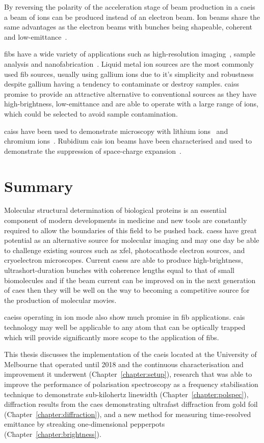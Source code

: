 By reversing the polarity of the acceleration stage of beam production in a \gls{caeis} a beam of ions can be produced instead of an electron beam.
Ion beams share the same advantages as the electron beams with bunches being shapeable, coherent and low-emittance~\cite{knuffman_cold_2013}.

\Glspl{fib} have a wide variety of applications such as high-resolution imaging~\cite{scipioni_helium_2008}, sample analysis and nanofabrication~\cite{khizroev_focused-ion-beam-based_2004}.
Liquid metal ion sources are the most commonly used \gls{fib} sources, usually using gallium ions due to it's simplicity and robustness despite gallium having a tendency to contaminate or destroy samples.
\Glspl{cais} promise to provide an attractive alternative to conventional sources as they have high-brightness, low-emittance and are able to operate with a large range of ions, which could be selected to avoid sample contamination.

\Glspl{cais} have been used to demonstrate microscopy with lithium ions~\cite{knuffman_nanoscale_2011} and chromium ions~\cite{steele_focused_2010}.
Rubidium \gls{cais} ion beams have been characterised and used to demonstrate the suppression of space-charge expansion~\cite{murphy_detailed_2014,thompson_suppression_2016}.

\section{Summary}

Molecular structural determination of biological proteins is an essential component of modern developments in medicine and new tools are constantly required to allow the boundaries of this field to be pushed back.
\Glspl{caes} have great potential as an alternative source for molecular imaging and may one day be able to challenge existing sources such as \gls{xfel}, photocathode electron sources, and cryoelectron microscopes.
Current \glspl{caes} are able to produce high-brightness, ultrashort-duration bunches with coherence lengths equal to that of small biomolecules and if the beam current can be improved on in the next generation of \gls{caes} then they will be well on the way to becoming a competitive source for the production of molecular movies.

\Glspl{caeis} operating in ion mode also show much promise in \gls{fib} applications.
\Gls{cais} technology may well be applicable to any atom that can be optically trapped which will provide significantly more scope to the application of \glspl{fib}.

This thesis discusses the implementation of the \gls{caeis} located at the University of Melbourne that operated until 2018 and the continuous characterisation and improvement it underwent (Chapter~\ref{chapter:setup}), research that was able to improve the performance of polarisation spectroscopy as a frequency stabilisation technique to demonstrate sub-kilohertz linewidth (Chapter~\ref{chapter:polspec}), diffraction results from the \gls{caes} demonstrating ultrafast diffraction from gold foil (Chapter~\ref{chapter:diffraction}), and a new method for measuring time-resolved emittance by streaking one-dimensional pepperpots (Chapter~\ref{chapter:brightness}).
